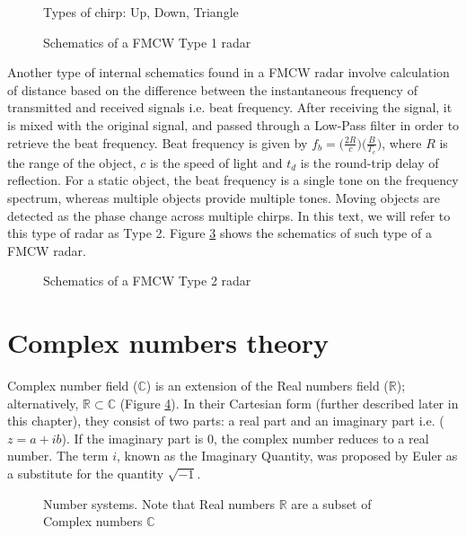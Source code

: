 \begin{figure}[htb]
	\centering
	\epsfxsize=4.5cm
	{}
	{}
	{}
	\caption{Types of chirp: Up, Down, Triangle}
	\label{fig:chirps}
\end{figure}

\begin{figure}[htb]
	\centering
	\epsfxsize=14cm
	{}
	\caption{Schematics of a FMCW Type 1 radar}
	\label{fig:fmcwrad}
\end{figure}

Another type of internal schematics found in a FMCW radar involve calculation of distance based on the difference between the instantaneous frequency of transmitted and received signals i.e. beat frequency. After receiving the signal, it is mixed with the original signal, and passed through a Low-Pass filter in order to retrieve the beat frequency. Beat frequency is given by $f_b=\bigg(\frac{2R}{c}\bigg)\bigg(\frac{B}{T_c}\bigg)$, where $R$ is the range of the object, $c$ is the speed of light and $t_d$ is the round-trip delay of reflection. For a static object, the beat frequency is a single tone on the frequency spectrum, whereas multiple objects provide multiple tones. Moving objects are detected as the phase change across multiple chirps. In this text, we will refer to this type of radar as Type 2. Figure \ref{type2} shows the schematics of such type of a FMCW radar.  

\begin{figure}[htb]
	\centering
	\epsfxsize=14cm
	{}
	\caption{Schematics of a FMCW Type 2 radar}
	\label{type2}
\end{figure}
\section{Complex numbers theory}

Complex number field ($\mathbb{C}$) is an extension of the Real numbers field ($\mathbb{R}$); alternatively, $\mathbb{R}\subset\mathbb{C}$ (Figure \ref{cfield}). In their Cartesian form (further described later in this chapter), they consist of two parts: a real part and an imaginary part i.e. ($z=a+ib$). If the imaginary part is $0$, the complex number reduces to a real number. The term $i$, known as the Imaginary Quantity, was proposed by Euler as a substitute for the quantity $\sqrt{-1}$. 
\begin{figure}[htb]
	\centering
	\epsfxsize=6cm
	{}
	\caption{Number systems. Note that Real numbers $\mathbb{R}$ are a subset of Complex numbers $\mathbb{C}$ \cite{cflied}}
	\label{cfield}
\end{figure}

